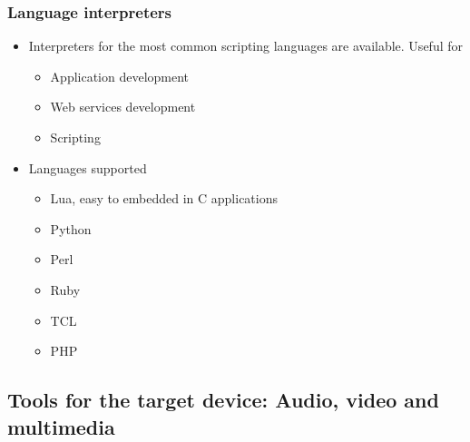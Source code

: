 \begin{frame}
  \frametitle{Language interpreters}
  \begin{itemize}
  \item Interpreters for the most common scripting languages are
    available. Useful for
    \begin{itemize}
    \item Application development
    \item Web services development
    \item Scripting
    \end{itemize}
  \item Languages supported
    \begin{itemize}
    \item Lua, easy to embedded in C applications
    \item Python
    \item Perl
    \item Ruby
    \item TCL
    \item PHP
    \end{itemize}
  \end{itemize}
\end{frame}

\subsection[Multimedia tools]{Tools for the target device: Audio,
  video and multimedia}

